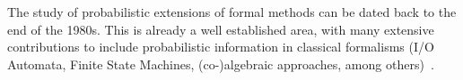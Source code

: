 The study of probabilistic extensions of formal methods can be dated back to the end of the 1980s. This is already a well established area, with many extensive contributions to include probabilistic information in classical formalisms (I/O Automata, Finite State Machines, (co-)algebraic approaches, among others)~\cite{ls91,rgs95,cdsy99,nun03,lnr06,csv07,dp07,dghm08,hm09,aprs11,sok11,hn12,dghm14,agl16}.
%
%
%		
%				
%				
